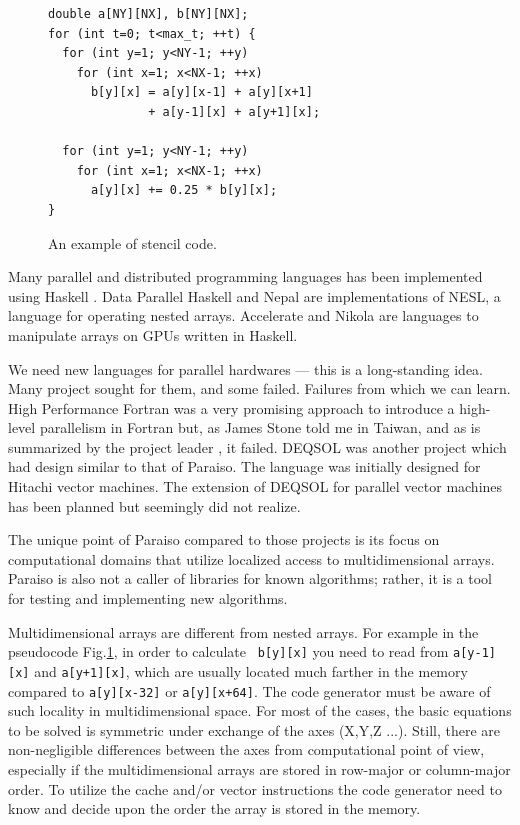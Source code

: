 \documentclass[twocolumn]{article}
\begin{document}
\begin{figure}
\begin{verbatim}
double a[NY][NX], b[NY][NX];
for (int t=0; t<max_t; ++t) {
  for (int y=1; y<NY-1; ++y) 
    for (int x=1; x<NX-1; ++x) 
      b[y][x] = a[y][x-1] + a[y][x+1] 
              + a[y-1][x] + a[y+1][x];

  for (int y=1; y<NY-1; ++y) 
    for (int x=1; x<NX-1; ++x) 
      a[y][x] += 0.25 * b[y][x];
}
\end{verbatim}
\caption{An example of stencil code.}\label{FigureStencilPseudoCode}
\end{figure}

Many parallel and distributed programming languages has been implemented using
Haskell \cite{CambridgeJournals:114967}. Data Parallel Haskell
\cite{nested-data-parallelism} and
Nepal\cite{springerlink:10.10073-540-44681-8_76} are implementations of NESL,
a language for operating nested arrays.
Accelerate \cite{Chakravarty:2011:AHA:1926354.1926358} and
Nikola \cite{Mainland:2010:NEC:1863523.1863533} are languages to manipulate arrays on GPUs written in Haskell.

We need new languages for parallel hardwares --- this is a long-standing
idea. Many project sought for them, and some failed. Failures from which we
can learn. High Performance Fortran was a very promising approach to introduce
a high-level parallelism in Fortran but, as James Stone told me in Taiwan, and
as is summarized by the project leader
\cite{Kennedy:2007:RFH:1238844.1238851}, it failed.  DEQSOL
\cite{SAGAWANOBUTOSHI:1989-01-15,Kon'no:1986:AIS:324493.325029} was another
project which had design similar to that of Paraiso. The language was
initially designed for Hitachi vector machines. The extension of DEQSOL for
parallel vector machines has been planned \cite{SagawaNobutoshi:1989-03-15}
but seemingly did not realize.

The unique point of Paraiso compared to those projects is its focus on
computational domains that utilize localized access to multidimensional
arrays. Paraiso is also not a caller of libraries for known algorithms;
rather, it is a tool for testing and implementing new algorithms.

Multidimensional arrays are different from nested arrays. For example in the
pseudocode Fig.\ref{FigureStencilPseudoCode}, in order to calculate {\tt
  b[y][x]} you need to read from {\tt a[y-1][x]} and {\tt a[y+1][x]}, which
are usually located much farther in the memory compared to {\tt a[y][x-32]} or
{\tt a[y][x+64]}. The code generator must be aware of such locality in
multidimensional space.  For most of the cases, the basic equations to be
solved is symmetric under exchange of the axes (X,Y,Z ...). Still, there are
non-negligible differences between the axes from computational point of view,
especially if the multidimensional arrays are stored in row-major or
column-major order. To utilize the cache and/or vector instructions the code
generator need to know and decide upon the order the array is stored in the
memory.
\end{document}
